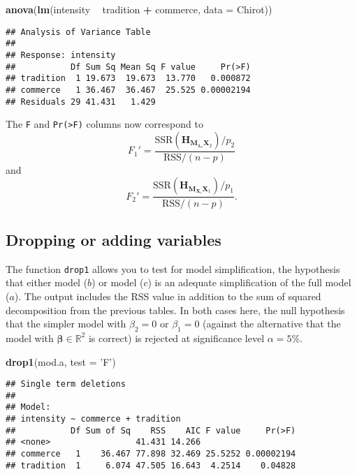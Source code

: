 \documentclass[]{book}
\newenvironment{Shaded}{\begin{snugshade}}{\end{snugshade}}
\newcommand{\DataTypeTok}[1]{\textcolor[rgb]{0.13,0.29,0.53}{#1}}
\newcommand{\KeywordTok}[1]{\textcolor[rgb]{0.13,0.29,0.53}{\textbf{#1}}}
\newcommand{\NormalTok}[1]{#1}
\newcommand{\OperatorTok}[1]{\textcolor[rgb]{0.81,0.36,0.00}{\textbf{#1}}}
\newcommand{\StringTok}[1]{\textcolor[rgb]{0.31,0.60,0.02}{#1}}
\theoremstyle{definition}
\theoremstyle{definition}
\theoremstyle{definition}
\theoremstyle{remark}
\begin{document}
\begin{Shaded}
\begin{Highlighting}[]
\KeywordTok{anova}\NormalTok{(}\KeywordTok{lm}\NormalTok{(intensity }\OperatorTok{~}\StringTok{ }\NormalTok{tradition }\OperatorTok{+}\StringTok{ }\NormalTok{commerce, }\DataTypeTok{data =}\NormalTok{ Chirot))}
\end{Highlighting}
\end{Shaded}

\begin{verbatim}
## Analysis of Variance Table
## 
## Response: intensity
##           Df Sum Sq Mean Sq F value     Pr(>F)
## tradition  1 19.673  19.673  13.770   0.000872
## commerce   1 36.467  36.467  25.525 0.00002194
## Residuals 29 41.431   1.429
\end{verbatim}

The \texttt{F} and \texttt{Pr(\textgreater{}F)} columns now correspond
to
\[F_1' = \frac{\mathrm{SSR}(\mathbf{H}_{\mathbf{M}_{\mathbf{1}_n}\mathbf{X}_2})/p_2}{\mathrm{RSS}/(n-p)}\]
and
\[F_2' = \frac{\mathrm{SSR}(\mathbf{H}_{\mathbf{M}_{\mathbf{X}_c}\mathbf{X}_1})/p_1}{\mathrm{RSS}/(n-p)}.\]

\hypertarget{dropping-or-adding-variables}{%
\subsection{Dropping or adding
variables}\label{dropping-or-adding-variables}}

The function \texttt{drop1} allows you to test for model simplification,
the hypothesis that either model (\(b\)) or model (\(c\)) is an adequate
simplification of the full model (\(a\)). The output includes the RSS
value in addition to the sum of squared decomposition from the previous
tables. In both cases here, the null hypothesis that the simpler model
with \(\beta_2=0\) or \(\beta_1=0\) (against the alternative that the
model with \(\boldsymbol{\beta} \in \mathbb{R}^2\) is correct) is
rejected at significance level \(\alpha = 5\%\).

\begin{Shaded}
\begin{Highlighting}[]
\KeywordTok{drop1}\NormalTok{(mod.a, }\DataTypeTok{test =} \StringTok{'F'}\NormalTok{)}
\end{Highlighting}
\end{Shaded}

\begin{verbatim}
## Single term deletions
## 
## Model:
## intensity ~ commerce + tradition
##           Df Sum of Sq    RSS    AIC F value     Pr(>F)
## <none>                 41.431 14.266                   
## commerce   1    36.467 77.898 32.469 25.5252 0.00002194
## tradition  1     6.074 47.505 16.643  4.2514    0.04828
\end{verbatim}
\end{document}
